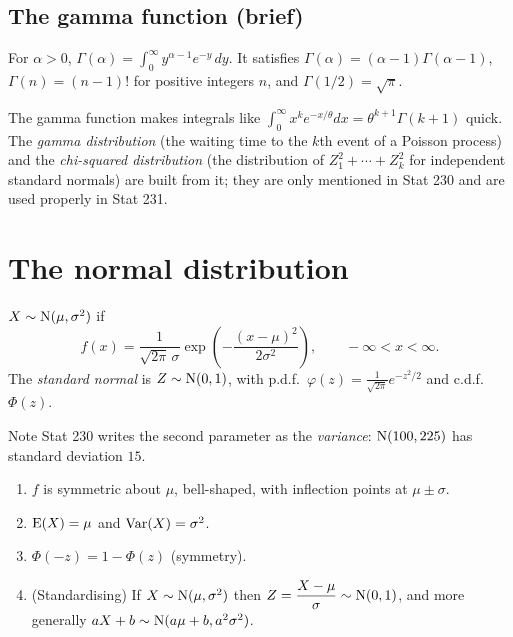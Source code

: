 \subsection{The gamma function (brief)}

\begin{definition}
For $\alpha > 0$, $\Gamma(\alpha) = \int_0^\infty y^{\alpha-1}e^{-y}\,dy$.
It satisfies $\Gamma(\alpha) = (\alpha-1)\Gamma(\alpha-1)$, $\Gamma(n) = (n-1)!$ for
positive integers $n$, and $\Gamma(1/2) = \sqrt\pi$.
\end{definition}

The gamma function makes integrals like $\int_0^\infty x^k e^{-x/\theta}dx =
\theta^{k+1}\Gamma(k+1)$ quick. The \emph{gamma distribution} (the waiting time to the
$k$th event of a Poisson process) and the \emph{chi-squared distribution} (the
distribution of $Z_1^2+\cdots+Z_k^2$ for independent standard normals) are built from it;
they are only mentioned in Stat 230 and are used properly in Stat 231.

\section{The normal distribution}

\begin{definition}[Normal]
$X\sim\operatorname{N}(\mu,\sigma^2)$ if
\[
  f(x) = \frac{1}{\sqrt{2\pi}\,\sigma}\exp\left(-\frac{(x-\mu)^2}{2\sigma^2}\right),
  \qquad -\infty<x<\infty.
\]
The \emph{standard normal} is $Z\sim\operatorname{N}(0,1)$, with p.d.f.\
$\varphi(z) = \frac{1}{\sqrt{2\pi}}e^{-z^2/2}$ and c.d.f.\ $\Phi(z)$.
\end{definition}

Note Stat 230 writes the second parameter as the \emph{variance}: $\operatorname{N}(100, 225)$ has
standard deviation $15$.

\begin{center}
\end{center}

\begin{theorem}
\begin{enumerate}
  \item $f$ is symmetric about $\mu$, bell-shaped, with inflection points at
        $\mu\pm\sigma$.
  \item $\operatorname{E}(X) = \mu$ and $\operatorname{Var}(X) = \sigma^2$.
  \item $\Phi(-z) = 1 - \Phi(z)$ (symmetry).
  \item (Standardising) If $X\sim\operatorname{N}(\mu,\sigma^2)$ then
        $Z = \dfrac{X-\mu}{\sigma}\sim\operatorname{N}(0,1)$, and more generally
        $aX+b\sim\operatorname{N}(a\mu+b, a^2\sigma^2)$.
\end{enumerate}
\end{theorem}

